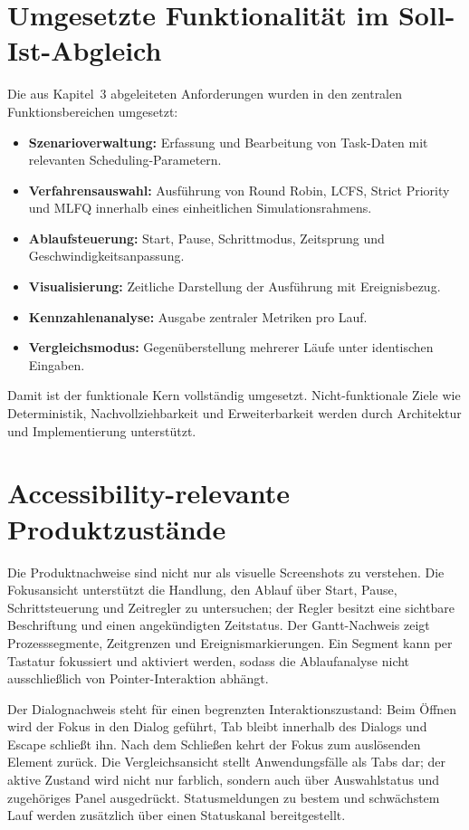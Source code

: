 \section{Umgesetzte Funktionalität im Soll-Ist-Abgleich}

Die aus Kapitel~3 abgeleiteten Anforderungen wurden in den zentralen Funktionsbereichen umgesetzt:

\begin{itemize}
    \item \textbf{Szenarioverwaltung:} Erfassung und Bearbeitung von Task-Daten mit relevanten Scheduling-Parametern.
    \item \textbf{Verfahrensauswahl:} Ausführung von Round Robin, LCFS, Strict Priority und MLFQ innerhalb eines einheitlichen Simulationsrahmens.
    \item \textbf{Ablaufsteuerung:} Start, Pause, Schrittmodus, Zeitsprung und Geschwindigkeitsanpassung.
    \item \textbf{Visualisierung:} Zeitliche Darstellung der Ausführung mit Ereignisbezug.
    \item \textbf{Kennzahlenanalyse:} Ausgabe zentraler Metriken pro Lauf.
    \item \textbf{Vergleichsmodus:} Gegenüberstellung mehrerer Läufe unter identischen Eingaben.
\end{itemize}

Damit ist der funktionale Kern vollständig umgesetzt. Nicht-funktionale Ziele wie Deterministik, Nachvollziehbarkeit und Erweiterbarkeit werden durch Architektur und Implementierung unterstützt.

\section{Accessibility-relevante Produktzustände}

Die Produktnachweise sind nicht nur als visuelle Screenshots zu verstehen. Die Fokusansicht unterstützt die Handlung, den Ablauf über Start, Pause, Schrittsteuerung und Zeitregler zu untersuchen; der Regler besitzt eine sichtbare Beschriftung und einen angekündigten Zeitstatus. Der Gantt-Nachweis zeigt Prozesssegmente, Zeitgrenzen und Ereignismarkierungen. Ein Segment kann per Tastatur fokussiert und aktiviert werden, sodass die Ablaufanalyse nicht ausschließlich von Pointer-Interaktion abhängt.

Der Dialognachweis steht für einen begrenzten Interaktionszustand: Beim Öffnen wird der Fokus in den Dialog geführt, Tab bleibt innerhalb des Dialogs und Escape schließt ihn. Nach dem Schließen kehrt der Fokus zum auslösenden Element zurück. Die Vergleichsansicht stellt Anwendungsfälle als Tabs dar; der aktive Zustand wird nicht nur farblich, sondern auch über Auswahlstatus und zugehöriges Panel ausgedrückt. Statusmeldungen zu bestem und schwächstem Lauf werden zusätzlich über einen Statuskanal bereitgestellt.


